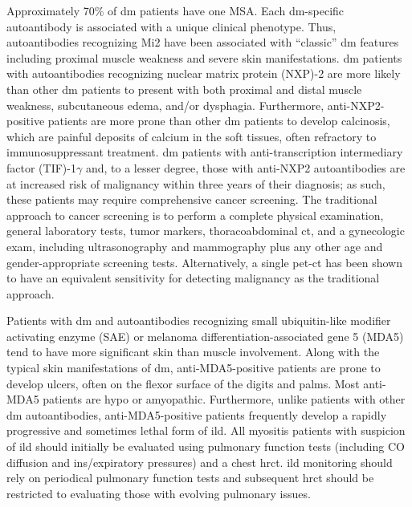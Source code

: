 Approximately 70\% of \gls{dm} patients have one MSA.\cite{Betteridge2016} Each \gls{dm}-specific autoantibody is associated with a unique clinical phenotype. Thus, autoantibodies recognizing Mi2 have been associated with “classic” \gls{dm} features including proximal muscle weakness and severe skin manifestations.\cite{Ghirardello2005} \gls{dm} patients with autoantibodies recognizing nuclear matrix protein (NXP)-2 are more likely than other \gls{dm} patients to present with both proximal and distal muscle weakness, subcutaneous edema, and/or dysphagia.\cite{Albayda2017} Furthermore, anti-NXP2-positive patients are more prone than other \gls{dm} patients to develop calcinosis, which are painful deposits of calcium in the soft tissues, often refractory to immunosuppressant treatment.\cite{Albayda2017} \gls{dm} patients with anti-transcription intermediary factor (TIF)-1$\gamma$ and, to a lesser degree, those with anti-NXP2 autoantibodies are at increased risk of malignancy within three years of their diagnosis; as such, these patients may require comprehensive cancer screening.\cite{Albayda2017,Fiorentino2013,TralleroAraguas2012} The traditional approach to cancer screening is to perform a complete physical examination, general laboratory tests, tumor markers, thoracoabdominal \gls{ct}, and a gynecologic exam, including ultrasonography and mammography plus any other age and gender-appropriate screening tests. Alternatively, a single \gls{pet}-\gls{ct} has been shown to have an equivalent sensitivity for detecting malignancy as the traditional approach.\cite{SelvaOCallaghan2010}

Patients with \gls{dm} and autoantibodies recognizing small ubiquitin-like modifier activating enzyme (SAE) or melanoma differentiation-associated gene 5 (MDA5) tend to have more significant skin than muscle involvement.\cite{Ge2017,LabradorHorrillo2014,Sato2009,Narang2015} Along with the typical skin manifestations of \gls{dm}, anti-MDA5-positive patients are prone to develop ulcers, often on the flexor surface of the digits and palms.\cite{Narang2015} Most anti-MDA5 patients are hypo or amyopathic.\cite{LabradorHorrillo2014,Sato2009,Narang2015} Furthermore, unlike patients with other \gls{dm} autoantibodies, anti-MDA5-positive patients frequently develop a rapidly progressive and sometimes lethal form of \gls{ild}.\cite{LabradorHorrillo2014,Sato2009} All myositis patients with suspicion of \gls{ild} should initially be evaluated using pulmonary function tests (including CO diffusion and ins/expiratory pressures) and a chest \gls{hrct}. \gls{ild} monitoring should rely on periodical pulmonary function tests and subsequent \gls{hrct} should be restricted to evaluating those with evolving pulmonary issues.\cite{SelvaOCallaghan2018}

